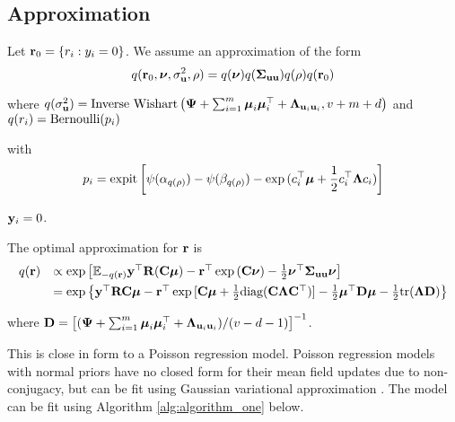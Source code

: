 \documentclass{article}[12pt]
\begin{document}
\subsection{Approximation}
Let ${\bf r}_0 = \{ r_i : y_i = 0 \}$.
We assume an approximation of the form
$$
q({\bf r}_0, {\boldsymbol \nu}, \sigma_{{\bf u}}^2, \rho) = q({\boldsymbol \nu}) q({\boldsymbol \Sigma}_{{\bf u} {\bf u}}) q(\rho) q({\bf r}_0) \\
$$

\noindent where 
$q(\sigma_{{\bf u}}^2) = \mbox{Inverse Wishart}\left({\boldsymbol \Psi} + \sum_{i=1}^m {\boldsymbol \mu}_i {\boldsymbol \mu}_i^\top + {\boldsymbol \Lambda}_{{\bf u}_i {\bf u}_i}, v + m + d\right)$ \mbox{and } $q(r_i) = \text{Bernoulli} (p_i)$

\noindent with
$$
p_i = \text{expit} \left[ \psi{(\alpha_{q(\rho)})} - \psi{(\beta_{q(\rho)})} - \exp{(c_i^\top{\boldsymbol\mu}+ {\frac{1}{2}}c_i^\top {\boldsymbol\Lambda}c_i)} \right]
$$

\noindent {} ${\bf y}_i = 0$.



\noindent The optimal approximation for ${\bf r}$ is
$$
\begin{array}{rl}
q({\bf r}) &\propto \exp \left [ {\mathbb E}_{-q({\bf r})}{\bf y}^\top{\bf R}({\bf C}{\boldsymbol \mu}) - {\bf r}^\top\exp{({\bf C}{\boldsymbol\nu})}-{\frac{1}{2}} {\boldsymbol \nu}^\top {\boldsymbol\Sigma}_{{\bf u} {\bf u}} {\boldsymbol \nu} \right ] \\ [1ex]
	&= \exp{ \left\{ {\bf y}^\top{\bf R}{\bf C}{\boldsymbol\mu}- {\bf r}^\top \exp{[{\bf C}{\boldsymbol\mu}+ {\frac{1}{2}}\text{diag}({\bf C}{\boldsymbol\Lambda}{\bf C}^\top)]} - {\frac{1}{2}}{\boldsymbol\mu}^\top {\bf D}{\boldsymbol\mu}- {\frac{1}{2}}\text{tr}({\boldsymbol\Lambda}{\bf D}) \right\} }
\end{array}
$$

\noindent where ${\bf D} =  \left[ ({\boldsymbol \Psi} + \sum_{i=1}^m {\boldsymbol \mu}_i {\boldsymbol \mu}_i^\top + {\boldsymbol \Lambda}_{{\bf u}_i{\bf u}_i}) / (v - d - 1) \right]^{-1}$. 

\noindent This is close in form to a Poisson regression model. Poisson regression models
with normal priors have no closed form for their mean field updates due to
non-conjugacy, but can be fit using Gaussian variational approximation
\citep{ormerod09}. The model can be fit using Algorithm \ref{alg:algorithm_one} below.
\end{document}
